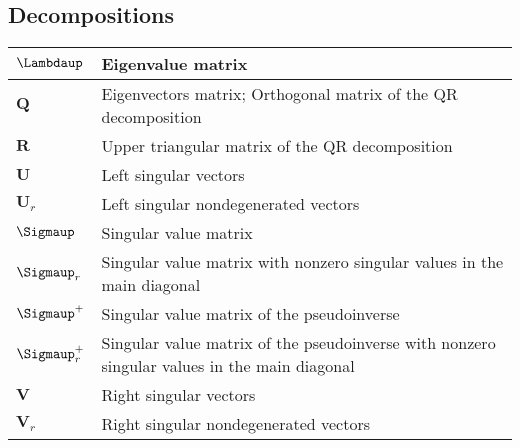 \documentclass{article}
\begin{document}
\subsection{Decompositions}
\begin{xltabular}{\textwidth}{XX}
    \(\boldsymbol{\Lambdaup}\)                                                                    & Eigenvalue matrix \cite{strangIntroductionLinearAlgebra1993}\\ \hline
    \(\mathbf{Q}\)                                                                                & Eigenvectors matrix; Orthogonal matrix of the QR decomposition\cite{strangIntroductionLinearAlgebra1993}\\ \hline
    \(\mathbf{R}\)                                                                                & Upper triangular matrix of the QR decomposition\cite{strangIntroductionLinearAlgebra1993}\\ \hline
    \(\mathbf{U}\)                                                                                & Left singular vectors\cite{strangIntroductionLinearAlgebra1993}\\ \hline
    \(\mathbf{U}_r\)                                                                              & Left singular nondegenerated vectors\\ \hline
    \(\boldsymbol{\Sigmaup}\)                                                                     & Singular value matrix\\ \hline
    \(\boldsymbol{\Sigmaup}_r\)                                                                   & Singular value matrix with nonzero singular values in the main diagonal\\ \hline
    \(\boldsymbol{\Sigmaup}^{+}\)                                                                 & Singular value matrix of the pseudoinverse \cite{strangIntroductionLinearAlgebra1993}\\ \hline
    \(\boldsymbol{\Sigmaup}^{+}_r\)                                                               & Singular value matrix of the pseudoinverse with nonzero singular values in the main diagonal\\ \hline
    \(\mathbf{V}\)                                                                                & Right singular vectors \cite{strangIntroductionLinearAlgebra1993}\\ \hline
    \(\mathbf{V}_r\)                                                                              & Right singular nondegenerated vectors\\ \hline

\end{xltabular}
\end{document}
